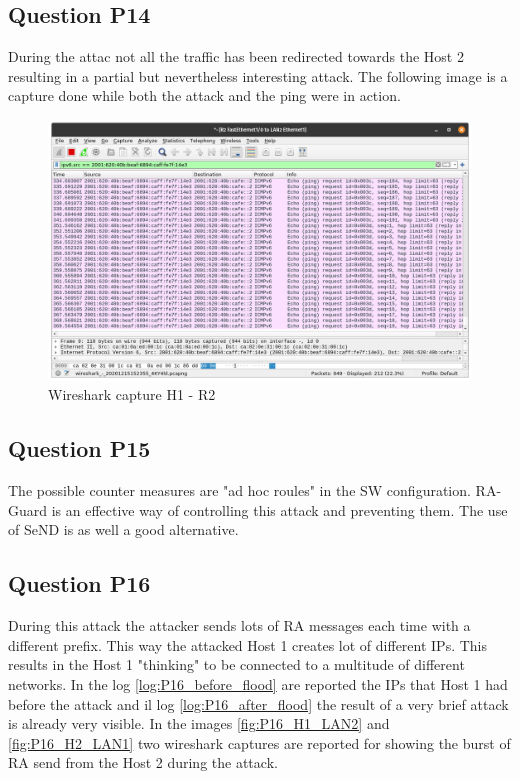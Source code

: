\subsection{Question P14}
During the attac not all the traffic has been redirected towards the Host 2 resulting in a partial but nevertheless interesting attack. The following image is a capture done while both the attack and the ping were in action.

\begin{figure}[H]
	\centering
	\includegraphics[width=\linewidth]{images/P14_H1_R2.png}
	\caption{Wireshark capture H1 - R2}
	\label{fig:not_deviated_ping}
\end{figure}

\subsection{Question P15}
The possible counter measures are "ad hoc roules" in the SW configuration. RA-Guard is an effective way of controlling this attack and preventing them. The use of SeND is as well a good alternative.

\subsection{Question P16}
During this attack the attacker sends lots of RA messages each time with a different prefix. This way the attacked Host 1 creates lot of different IPs. This results in the Host 1 "thinking" to be connected to a multitude of different networks. In the log \ref{log:P16_before_flood} are reported the IPs that Host 1 had before the attack and il log \ref{log:P16_after_flood} the result of a very brief attack is already very visible. In the images \ref{fig:P16_H1_LAN2} and \ref{fig:P16_H2_LAN1} two wireshark captures are reported for showing the burst of RA send from the Host 2 during the attack.

